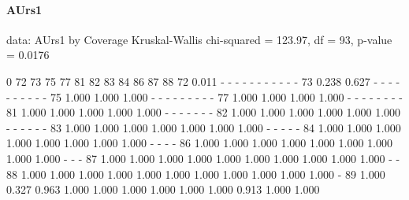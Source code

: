 \documentclass[a4paper,headsepline,footsepline,fontsize=11pt,BCOR=12mm,DIV=12]{report}
\begin{document}
\paragraph{AUrs1}

data:  AUrs1 by Coverage
Kruskal-Wallis chi-squared = 123.97, df = 93, p-value = 0.0176

   0     72    73    75    77    81    82    83    84    86    87    88   
72 0.011 -     -     -     -     -     -     -     -     -     -     -    
73 0.238 0.627 -     -     -     -     -     -     -     -     -     -    
75 1.000 1.000 1.000 -     -     -     -     -     -     -     -     -    
77 1.000 1.000 1.000 1.000 -     -     -     -     -     -     -     -    
81 1.000 1.000 1.000 1.000 1.000 -     -     -     -     -     -     -    
82 1.000 1.000 1.000 1.000 1.000 1.000 -     -     -     -     -     -    
83 1.000 1.000 1.000 1.000 1.000 1.000 1.000 -     -     -     -     -    
84 1.000 1.000 1.000 1.000 1.000 1.000 1.000 1.000 -     -     -     -    
86 1.000 1.000 1.000 1.000 1.000 1.000 1.000 1.000 1.000 -     -     -    
87 1.000 1.000 1.000 1.000 1.000 1.000 1.000 1.000 1.000 1.000 -     -    
88 1.000 1.000 1.000 1.000 1.000 1.000 1.000 1.000 1.000 1.000 1.000 -    
89 1.000 0.327 0.963 1.000 1.000 1.000 1.000 1.000 1.000 0.913 1.000 1.000
\end{document}
